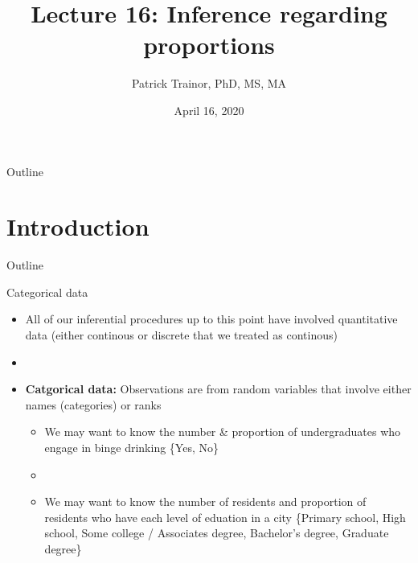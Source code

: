 \documentclass[xcolor=dvipsnames]{beamer}
\title[Lecture 16]{Lecture 16: Inference regarding proportions}
\author[Patrick Trainor]{Patrick Trainor, PhD, MS, MA}
\institute[NMSU]{New Mexico State University}
\date{April 16, 2020}
\begin{document}
	
\begin{frame}
	\maketitle
\end{frame}

\begin{frame}{Outline}
	\tableofcontents[hideallsubsections]
\end{frame}

\section{Introduction}

\begin{frame}{Outline}
	\tableofcontents[currentsection,subsectionstyle=show/shaded/hide]
\end{frame}

\begin{frame}{Categorical data}
	\begin{itemize}
		\item All of our inferential procedures up to this point have involved quantitative data (either continous or discrete that we treated as continous) \pause
		\item[]
		\item \textbf{Catgorical data:} Observations are from random variables that involve either names (categories) or ranks \pause
		\begin{itemize}
			\item We may want to know the number \& proportion of undergraduates who engage in binge drinking \{Yes, No\} \pause
			\item[]
			\item We may want to know the number of residents and proportion of residents who have each level of eduation in a city \{Primary school, High school, Some college / Associates degree, Bachelor's degree, Graduate degree\}
		\end{itemize}
	\end{itemize}
\end{frame}
\end{document}
